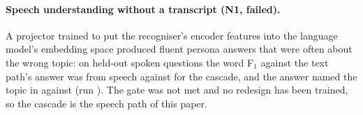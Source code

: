 \begin{table}[t]
\centering\small

\caption{Stages of a spoken turn, run \code{\LatencyRunId}. Whole-turn time is the card's cost, not the listener's wait: the audio is longer than the turn.}
\label{tab:latency}
\end{table}

\paragraph{Speech understanding without a transcript (N1, failed).}
A projector trained to put the recogniser's encoder features into the language model's embedding space produced fluent persona answers that were often about the wrong topic: on \SpeechInTurns{} held-out spoken questions the word F$_1$ against the text path's answer was \SpeechInF{} from speech against \CascadeF{} for the cascade, and the answer named the topic in \SpeechInTopic{} against \CascadeTopic{} (run ).
The gate was not met and no redesign has been trained, so the cascade is the speech path of this paper.
